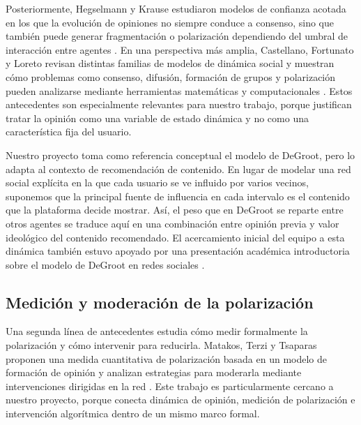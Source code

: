 \documentclass[10pt,letterpaper]{article}
\begin{document}
Posteriormente, Hegselmann y Krause estudiaron modelos de confianza acotada en los que la evoluci\'on de opiniones no siempre conduce a consenso, sino que tambi\'en puede generar fragmentaci\'on o polarizaci\'on dependiendo del umbral de interacci\'on entre agentes \cite{hegselmann-krause}. En una perspectiva m\'as amplia, Castellano, Fortunato y Loreto revisan distintas familias de modelos de din\'amica social y muestran c\'omo problemas como consenso, difusi\'on, formaci\'on de grupos y polarizaci\'on pueden analizarse mediante herramientas matem\'aticas y computacionales \cite{castellano-fortunato-loreto}. Estos antecedentes son especialmente relevantes para nuestro trabajo, porque justifican tratar la opini\'on como una variable de estado din\'amica y no como una caracter\'istica fija del usuario.

Nuestro proyecto toma como referencia conceptual el modelo de DeGroot, pero lo adapta al contexto de recomendaci\'on de contenido. En lugar de modelar una red social expl\'icita en la que cada usuario se ve influido por varios vecinos, suponemos que la principal fuente de influencia en cada intervalo es el contenido que la plataforma decide mostrar. As\'i, el peso que en DeGroot se reparte entre otros agentes se traduce aqu\'i en una combinaci\'on entre opini\'on previa y valor ideol\'ogico del contenido recomendado. El acercamiento inicial del equipo a esta din\'amica tambi\'en estuvo apoyado por una presentaci\'on acad\'emica introductoria sobre el modelo de DeGroot en redes sociales \cite{vargas2026degroot}.

\subsection{Medici\'on y moderaci\'on de la polarizaci\'on}

Una segunda l\'inea de antecedentes estudia c\'omo medir formalmente la polarizaci\'on y c\'omo intervenir para reducirla. Matakos, Terzi y Tsaparas proponen una medida cuantitativa de polarizaci\'on basada en un modelo de formaci\'on de opini\'on y analizan estrategias para moderarla mediante intervenciones dirigidas en la red \cite{matakos2017}. Este trabajo es particularmente cercano a nuestro proyecto, porque conecta din\'amica de opini\'on, medici\'on de polarizaci\'on e intervenci\'on algor\'itmica dentro de un mismo marco formal.
\end{document}
